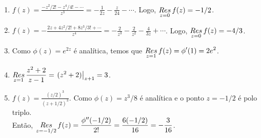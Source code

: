 \begin{questions}
%
\begin{solution}
    \begin{enumerate}[label=(\alph*)]
      \item $\displaystyle f(z) = \frac{-z^2/2! - z^4/4! - \cdots}{z^3} = - \frac{1}{2z} - \frac{z}{24} - \cdots$. Logo, $\mathop{Res}\limits_{z=0} f(z) = -1/2$.
      
      \item $\displaystyle f(z) = -\frac{2z + 4z^2/2! + 8z^3/3! + \cdots}{z^4} = -\frac{2}{z^3} - \frac{2}{z^2} - \frac{4}{3z} + \cdots$. Logo, $\mathop{Res}\limits_{z=0} f(z) = -4/3$.
      
      \item Como $\phi(z) = e^{2z}$ é analítica, temos que $\displaystyle \mathop{Res}\limits_{z=1} f(z) = \phi'(1) = 2 e^2$.
      
      \item $\displaystyle \mathop{Res}\limits_{z=1} \frac{z^2 + 2}{z-1} = \left.(z^2+2)\right|_{z+1} = 3$.
      
      \item $\displaystyle f(z) = \frac{(z/2)^3}{(z + 1/2)^3}$. Como $\phi(z) = z^3/8$ é analítica e o ponto $z=-1/2$ é polo triplo.\\
      Então, $\displaystyle \mathop{Res}\limits_{z=-1/2} f(z) = \frac{\phi''(-1/2)}{2!} = \frac{6(-1/2)}{16} = -\frac{3}{16}$.
      

\end{enumerate}
\end{solution}
\end{questions}
